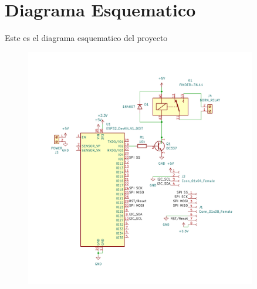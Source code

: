 \documentclass[../informe_krapp.tex]{subfiles}
\begin{document}
\graphicspath{{../images/}}
\section{Diagrama Esquematico}
Este es el diagrama esquematico del proyecto
\begin{figure}[H]
	\centering
	\includegraphics[width=0.9\textwidth]{esquematico.pdf}
\end{figure}
\end{document}
